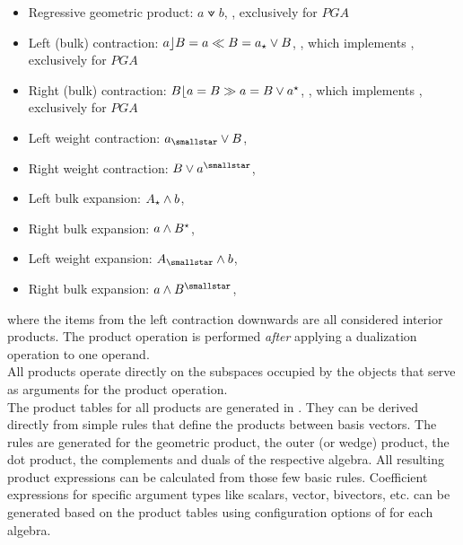 \begin{itemize}
    \item Regressive geometric product: $a \veedot b$, , exclusively for
    $PGA$ 
    
    \item Left (bulk) contraction: $a \rfloor B = a \ll B = {a}_\star \vee B $,
    , which implements , exclusively
    for $PGA$
    
    \item Right (bulk) contraction: $B \lfloor a = B \gg a = B \vee {a}^\star $,
    , which implements ,
    exclusively for $PGA$

    \item Left weight contraction: $\leftweightdual{a} \vee B $,
    
    \item Right weight contraction: $B \vee \rightweightdual{a} $,

    \item Left bulk expansion: ${A}_\star \wedge b $,
    
    \item Right bulk expansion: $a \wedge {B}^\star $,

    \item Left weight expansion: $\leftweightdual{A} \wedge b $,
    
    \item Right bulk expansion: $a \wedge \rightweightdual{B} $,
\end{itemize}
where the items from the left contraction downwards are all considered interior products.
The product operation is performed \emph{after} applying a dualization operation to one
operand. \\

All products operate directly on the subspaces occupied by the objects that serve as
arguments for the product operation. \\ 

The product tables for all products are generated in . They can be
derived directly from simple rules that define the products between basis vectors. The
rules are generated for the geometric product, the outer (or wedge) product, the dot
product, the complements and duals of the respective algebra. All resulting product
expressions can be calculated from those few basic rules. Coefficient expressions for
specific argument types like scalars, vector, bivectors, etc. can be generated based on
the product tables using configuration options of  for each algebra. \\

